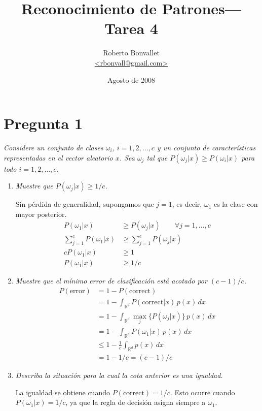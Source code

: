 \documentclass[spanish]{article}
\title{Reconocimiento de Patrones---Tarea 4}
\author{Roberto Bonvallet \\ \url {<rbonvall@gmail.com>}}
\date{Agosto de 2008}
\newcommand{\pregunta}{\textit}
\newcommand{\given}{\vert}
\newcommand{\R}{\mathbb{R}}
\begin{document}
\maketitle

\section*{Pregunta 1}
\pregunta{
    Considere un conjunto de clases $\omega_i$, $i = 1, 2, \ldots, c$ y un conjunto de
    características representadas en el vector aleatorio $x$.  Sea $\omega_j$ tal que
    $P(\omega_j\given x)\ge P(\omega_i\given x)$ para todo $i = 1, 2, \ldots, c$.
}
\begin{enumerate}
    \item \pregunta{Muestre que $P(\omega_j\given x) \ge 1/c$.}

        Sin pérdida de generalidad, supongamos que $j = 1$, es decir, $\omega_1$ es la clase con
        mayor posterior.
        \begin{align}
            P(\omega_1\given x)   &\ge P(\omega_j\given x) \qquad\forall j = 1,\ldots, c \\
            \sum_{j=1}^c P(\omega_1\given x) &\ge \sum_{j=1}^c P(\omega_j\given x) \\
            c P(\omega_1\given x) &\ge 1 \\
            P(\omega_1\given x) &\ge 1/c 
        \end{align}

    \item \pregunta{Muestre que el mínimo error de clasificación está acotado por $(c - 1)/c$.}
        \begin{align}
            P(\text{error}) &= 1 - P(\text{correct}) \\
                &= 1 - \int_{\R^d} P(\text{correct}\given x)\,p(x)\,dx \\
                &= 1 - \int_{\R^d} \max_j \bigl\{ P(\omega_j\given x)\bigr\}\,p(x)\,dx \\
                &= 1 - \int_{\R^d} P(\omega_1\given x)\,p(x)\,dx \\
                &\le 1 - \frac{1}{c} \int_{\R^d} p(x)\,dx \\
                &= 1 - 1/c = (c - 1)/c
        \end{align}

    \item \pregunta{Describa la situación para la cual la cota anterior es una igualdad.}

        La igualdad se obtiene cuando $P(\text{correct}) = 1/c$.  Esto ocurre cuando
        $P(\omega_1\given x) = 1/c$, ya que la regla de decisión asigna siempre a $\omega_1$.


\end{enumerate}
\end{document}
